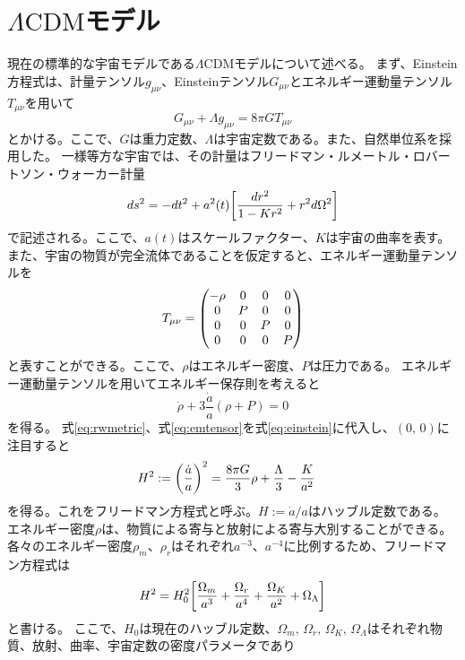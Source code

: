 \documentclass[../../main.tex]{subfiles}
\begin{document}
\section{$\Lambda\mathrm{CDM}$モデル}
現在の標準的な宇宙モデルである$\Lambda\mathrm{CDM}$モデルについて述べる。
まず、Einstein方程式は、計量テンソル$g_{\mu\nu}$、Einsteinテンソル$G_{\mu\nu}$とエネルギー運動量テンソル$T_{\mu\nu}$を用いて
\begin{equation}
    \label{eq:einstein}
    G_{\mu\nu}+\Lambda g_{\mu\nu}=8\pi GT_{\mu\nu}
\end{equation}
とかける。ここで、$G$は重力定数、$\Lambda$は宇宙定数である。また、自然単位系を採用した。
一様等方な宇宙では、その計量はフリードマン・ルメートル・ロバートソン・ウォーカー計量
\begin{equation}
    \label{eq:rwmetric}
    ds^2=-dt^2+a^2(t)\qty[\frac{dr^2}{1-Kr^2}+r^2d\Omega^2]
\end{equation}
で記述される。ここで、$a(t)$はスケールファクター、$K$は宇宙の曲率を表す。
また、宇宙の物質が完全流体であることを仮定すると、エネルギー運動量テンソルを
\begin{equation}
    \label{eq:emtensor}
    T_{\mu\nu}=\mqty(-\rho&0&0&0\\0&P&0&0\\0&0&P&0\\0&0&0&P)
\end{equation}
と表すことができる。ここで、$\rho$はエネルギー密度、$P$は圧力である。
エネルギー運動量テンソルを用いてエネルギー保存則を考えると
\begin{equation}
    \label{eq:energyconservation}
    \dot{\rho}+3\dfrac{\dot{a}}{a}(\rho+P)=0
\end{equation}
を得る。
式\eqref{eq:rwmetric}、式\eqref{eq:emtensor}を式\eqref{eq:einstein}に代入し、$(0,\,0)$に注目すると
\begin{align}
    \label{eq:friedmann}
    H^2:=\qty(\dfrac{\dot{a}}{a})^2 &= \dfrac{8\pi G}{3}\rho+\dfrac{\Lambda}{3}-\dfrac{K}{a^2}
\end{align}
を得る。これをフリードマン方程式と呼ぶ。$H:=\dot{a}/a$はハッブル定数である。
エネルギー密度$\rho$は、物質による寄与と放射による寄与大別することができる。
各々のエネルギー密度$\rho_m$、$\rho_r$はそれぞれ$a^{-3}$、$a^{-4}$に比例するため、フリードマン方程式は
\begin{equation}
    \label{eq:friedmann2}
    H^2=H_0^2\qty[\dfrac{\Omega_m}{a^3}+\dfrac{\Omega_r}{a^4}+\dfrac{\Omega_{K}}{a^2}+\Omega_{\Lambda}]
\end{equation}
と書ける。
ここで、$H_0$は現在のハッブル定数、$\Omega_m,\,\Omega_r,\,\Omega_{K},\,\Omega_{\Lambda}$はそれぞれ物質、放射、曲率、宇宙定数の密度パラメータであり
\end{document}
